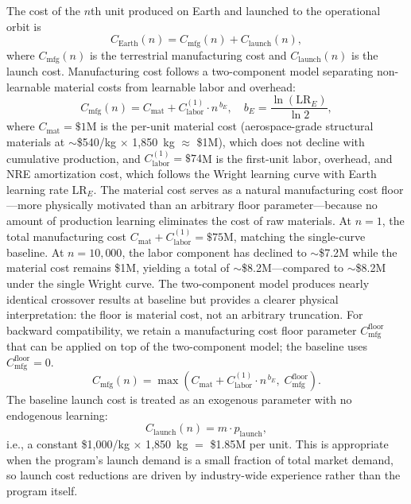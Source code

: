 \documentclass[preprint,12pt]{elsarticle}
\begin{document}
The cost of the $n$th unit produced on Earth and launched to the operational orbit is
\begin{equation}
  C_{\mathrm{Earth}}(n) = C_{\mathrm{mfg}}(n) + C_{\mathrm{launch}}(n),
  \label{eq:earth_unit}
\end{equation}
where $C_{\mathrm{mfg}}(n)$ is the terrestrial manufacturing cost and $C_{\mathrm{launch}}(n)$ is the launch cost. Manufacturing cost follows a two-component model separating non-learnable material costs from learnable labor and overhead:
\begin{equation}
  C_{\mathrm{mfg}}(n) = C_{\mathrm{mat}} + C_{\mathrm{labor}}^{(1)} \cdot n^{\,b_E}, \quad b_E = \frac{\ln(\mathrm{LR}_E)}{\ln 2},
  \label{eq:earth_mfg}
\end{equation}
where $C_{\mathrm{mat}} = \$1$M is the per-unit material cost (aerospace-grade structural materials at $\sim$\$540/kg $\times$ 1{,}850~kg $\approx$ \$1M), which does not decline with cumulative production, and $C_{\mathrm{labor}}^{(1)} = \$74$M is the first-unit labor, overhead, and NRE amortization cost, which follows the Wright learning curve with Earth learning rate $\mathrm{LR}_E$. The material cost serves as a natural manufacturing cost floor---more physically motivated than an arbitrary floor parameter---because no amount of production learning eliminates the cost of raw materials. At $n = 1$, the total manufacturing cost $C_{\mathrm{mat}} + C_{\mathrm{labor}}^{(1)} = \$75$M, matching the single-curve baseline. At $n = 10{,}000$, the labor component has declined to $\sim$\$7.2M while the material cost remains \$1M, yielding a total of $\sim$\$8.2M---compared to $\sim$\$8.2M under the single Wright curve. The two-component model produces nearly identical crossover results at baseline but provides a clearer physical interpretation: the floor is material cost, not an arbitrary truncation. For backward compatibility, we retain a manufacturing cost floor parameter $C_{\mathrm{mfg}}^{\mathrm{floor}}$ that can be applied on top of the two-component model; the baseline uses $C_{\mathrm{mfg}}^{\mathrm{floor}} = 0$.
\begin{equation}
  C_{\mathrm{mfg}}(n) = \max\!\left(C_{\mathrm{mat}} + C_{\mathrm{labor}}^{(1)} \cdot n^{\,b_E},\; C_{\mathrm{mfg}}^{\mathrm{floor}}\right).
  \label{eq:earth_mfg_floor}
\end{equation}
The baseline launch cost is treated as an exogenous parameter with no endogenous learning:
\begin{equation}
  C_{\mathrm{launch}}(n) = m \cdot p_{\mathrm{launch}},
  \label{eq:earth_launch_baseline}
\end{equation}
i.e., a constant \$1{,}000/kg $\times$ 1{,}850~kg $=$ \$1.85M per unit. This is appropriate when the program's launch demand is a small fraction of total market demand, so launch cost reductions are driven by industry-wide experience rather than the program itself.
\end{document}
